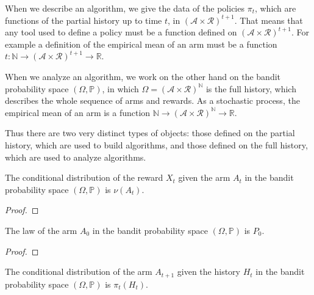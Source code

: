 \begin{remark}
When we describe an algorithm, we give the data of the policies $\pi_t$, which are functions of the partial history up to time $t$, in $(\mathcal{A} \times \mathcal{R})^{t+1}$.
That means that any tool used to define a policy must be a function defined on $(\mathcal{A} \times \mathcal{R})^{t+1}$.
For example a definition of the empirical mean of an arm must be a function $t : \mathbb{N} \to (\mathcal{A} \times \mathcal{R})^{t+1} \to \mathbb{R}$.

When we analyze an algorithm, we work on the other hand on the bandit probability space $(\Omega, \mathbb{P})$, in which $\Omega = (\mathcal{A} \times \mathcal{R})^{\mathbb{N}}$ is the full history, which describes the whole sequence of arms and rewards.
As a stochastic process, the empirical mean of an arm is a function $\mathbb{N} \to (\mathcal{A} \times \mathcal{R})^{\mathbb{N}} \to \mathbb{R}$.

Thus there are two very distinct types of objects: those defined on the partial history, which are used to build algorithms, and those defined on the full history, which are used to analyze algorithms.
\end{remark}


\begin{lemma}\label{lem:condDistrib_reward}
  \leanok
The conditional distribution of the reward $X_t$ given the arm $A_t$ in the bandit probability space $(\Omega, \mathbb{P})$ is $\nu(A_t)$.
\end{lemma}

\begin{proof}

\end{proof}


\begin{lemma}\label{lem:law_arm_zero}
The law of the arm $A_0$ in the bandit probability space $(\Omega, \mathbb{P})$ is $P_0$.
\end{lemma}

\begin{proof}

\end{proof}


\begin{lemma}\label{lem:condDistrib_arm}
  \leanok
The conditional distribution of the arm $A_{t+1}$ given the history $H_t$ in the bandit probability space $(\Omega, \mathbb{P})$ is $\pi_t(H_t)$.
\end{lemma}

